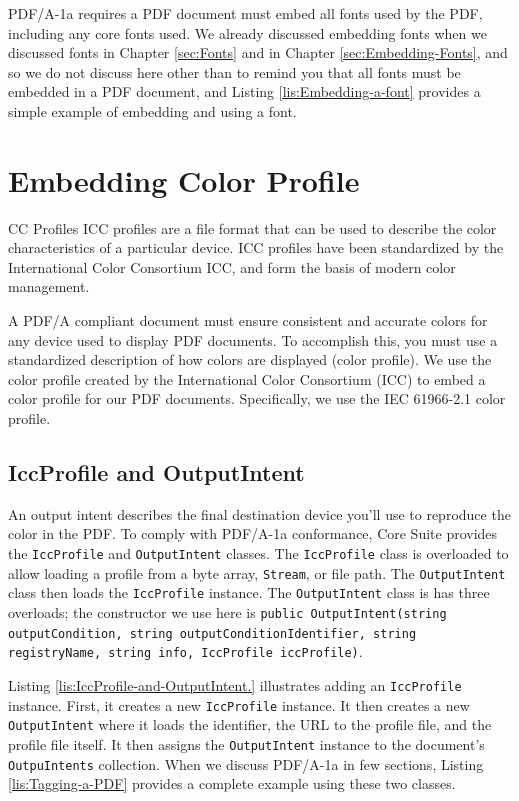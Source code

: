 \documentclass[american,letterpaper]{tufte-book}
\numberwithin{equation}{section}
\numberwithin{figure}{section}
\begin{document}
{{PDF/A-1a requires a PDF document must embed all fonts used by the
PDF, including any core fonts used. We already discussed embedding
fonts when we discussed fonts in Chapter \ref{sec:Fonts} and in Chapter
\ref{sec:Embedding-Fonts}, and so we do not discuss here other than
to remind you that all fonts must be embedded in a PDF document, and
Listing \ref{lis:Embedding-a-font} provides a simple example of embedding
and using a font.

\section{Embedding Color Profile}

CC Profiles ICC profiles are a file format that can be used to describe
the color characteristics of a particular device. ICC profiles have
been standardized by the International Color Consortium ICC, and form
the basis of modern color management.

A PDF/A compliant document must ensure consistent and accurate colors
for any device used to display PDF documents. To accomplish this,
you must use a standardized description of how colors are displayed
(color profile). We use the color profile created by the International
Color Consortium (ICC) to embed a color profile for our PDF documents.
Specifically, we use the IEC 61966-2.1 color profile.

\subsection{IccProfile and OutputIntent}

An output intent describes the final destination device you'll use
to reproduce the color in the PDF. To comply with PDF/A-1a conformance,
Core Suite provides the \texttt{IccProfile} and \texttt{OutputIntent}
classes. The \texttt{IccProfile} class is overloaded to allow loading
a profile from a byte array, \texttt{Stream}, or file path. The \texttt{OutputIntent}
class then loads the \texttt{IccProfile} instance. The \texttt{OutputIntent}
class is has three overloads; the constructor we use here is \texttt{public
OutputIntent(string outputCondition, string outputConditionIdentifier,
string registryName, string info, IccProfile iccProfile)}. 

Listing \ref{lis:IccProfile-and-OutputIntent.} illustrates adding
an \texttt{IccProfile} instance. First, it creates a new \texttt{IccProfile}
instance. It then creates a new \texttt{OutputIntent} where it loads
the identifier, the URL to the profile file, and the profile file
itself. It then assigns the \texttt{OutputIntent} instance to the
document's \texttt{OutpuIntents} collection. When we discuss PDF/A-1a
in few sections, Listing \ref{lis:Tagging-a-PDF} provides a complete
example using these two classes.

}}
\end{document}
